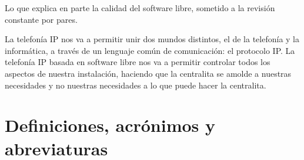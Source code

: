 Lo que explica en parte la calidad del software libre, sometido a la revisión constante por pares.

La telefonía IP nos va a permitir unir dos mundos distintos, el de la telefonía y la informática, a través de un lenguaje común de comunicación: el protocolo IP. La telefonía IP basada en software libre nos va a permitir controlar todos los aspectos de nuestra instalación, haciendo que la centralita se amolde a nuestras necesidades y no nuestras necesidades a lo que puede hacer la centralita.



\section{Definiciones, acrónimos y abreviaturas}

